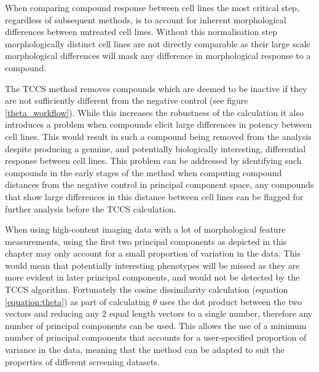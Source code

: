 \documentclass[a4paper,11pt,twoside,openright]{scrbook}
\begin{document}
When comparing compound response between cell lines the most critical step, regardless of subsequent methods, is to account for inherent morphological differences between untreated cell lines.
Without this normalisation step morphologically distinct cell lines are not directly comparable as their large scale morphological differences will mask any difference in morphological response to a compound.

The TCCS method removes compounds which are deemed to be inactive if they are not sufficiently different from the negative control (see figure \ref{theta_workflow}).
While this increases the robustness of the calculation it also introduces a problem when compounds elicit large differences in potency between cell lines.
This would result in such a compound being removed from the analysis despite producing a genuine, and potentially biologically interesting, differential response between cell lines.
This problem can be addressed by identifying such compounds in the early stages of the method when computing compound distances from the negative control in principal component space, any compounds that show large differences in this distance between cell lines can be flagged for further analysis before the TCCS calculation.


When using high-content imaging data with a lot of morphological feature measurements, using the first two principal components as depicted in this chapter may only account for a small proportion of variation in the data.
This would mean that potentially interesting phenotypes will be missed as they are more evident in later principal components, and would not be detected by the TCCS algorithm.
Fortunately the cosine dissimilarity calculation (equation \ref{equation:theta}) as part of calculating $\theta$ uses the dot product between the two vectors and reducing any 2 equal length vectors to a single number, therefore any number of principal components can be used.
This allows the use of a minimum number of principal components that accounts for a user-specified proportion of variance in the data, meaning that the method can be adapted to suit the properties of different screening datasets.
\end{document}
